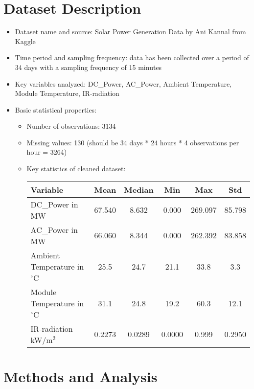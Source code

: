 \documentclass[10pt]{article}
\begin{document}
\section{Dataset Description}
\begin{itemize}
    \item Dataset name and source: Solar Power Generation Data by Ani Kannal from Kaggle
    \item Time period and sampling frequency: data has been collected over a period of 34 days with a sampling frequency of 15 minutes
    \item Key variables analyzed: DC\_Power, AC\_Power, Ambient Temperature, Module Temperature, IR-radiation
    \item Basic statistical properties:
    \begin{itemize}
        \item Number of observations: 3134
        \item Missing values: 130 (should be 34 days * 24 hours * 4 observations per hour = 3264)
        \item Key statistics of cleaned dataset: 
            \begin{table}[h!]
            \centering
            \begin{tabular}{lccccc}
            \toprule
            Variable & Mean & Median & Min & Max & Std \\
            \midrule
            DC\_Power in MW & 67.540 & 8.632 & 0.000 & 269.097 & 85.798 \\
            AC\_Power in MW & 66.060 & 8.344 & 0.000 & 262.392 & 83.858 \\
            Ambient Temperature in $^\circ$C & 25.5 & 24.7 & 21.1 & 33.8 & 3.3 \\
            Module Temperature in $^\circ$C & 31.1 & 24.8 & 19.2 & 60.3 & 12.1 \\
            IR-radiation kW/m$^2$ & 0.2273 & 0.0289 & 0.0000 & 0.999 & 0.2950 \\
            \bottomrule
            \end{tabular}
            \label{tab:basic_stats}
            \end{table}
    \end{itemize}
\end{itemize}

\section{Methods and Analysis}
\end{document}
